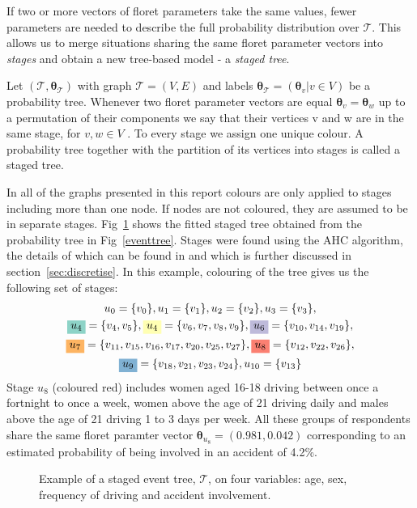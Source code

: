 \documentclass[runningheads]{llncs}
\begin{document}
If two or more vectors of floret parameters take the same values, fewer parameters are needed to describe the full probability distribution over $\mathcal{T}$. This allows us to merge situations sharing the same floret parameter vectors into \emph{stages} and obtain a new tree-based model - a \emph{staged tree}.
\begin{definition}
Let $(\mathcal{T} , \boldsymbol{\theta}_{\mathcal{T}})$ with graph $\mathcal{T} = (V, E)$ and labels $ \boldsymbol{\theta}_{\mathcal{T}} = ( \boldsymbol{\theta}_v | v \in V)$ be a probability tree. Whenever two floret parameter vectors are equal $\boldsymbol{\theta}_v = \boldsymbol{\theta}_w$ up to a permutation of their components we say that their vertices v and w are in the same stage, for $v, w \in V$ . To every stage we assign one unique colour. A probability tree together with the partition of its vertices into stages is called a staged tree.
\end{definition}
In all of the graphs presented in this report colours are only applied to stages including more than one node. If nodes are not coloured, they are assumed to be in separate stages. Fig~\ref{stagedtree} shows the fitted staged tree obtained from the probability tree in Fig~\ref{eventtree}. Stages were found using the AHC algorithm, the details of which can be found in \cite{freemansmith2011} and which is further discussed in section~\ref{sec:discretise}. In this example, colouring of the tree gives us the following set of stages:
\begin{gather*}
u_0 = \{v_0\}, u_1 = \{v_1\}, u_2 = \{v_2\}, u_3 = \{v_3\}, \\
\colorbox{col1}{$u_4$} = \{v_4, v_5\}, \colorbox{col2}{$u_4$}  = \{v_6, v_7, v_8, v_9\}, \colorbox{col3}{$u_6$}  = \{v_{10}, v_{14}, v_{19}\}, \\
\colorbox{col6}{$u_7$}  = \{v_{11}, v_{15}, v_{16}, v_{17}, v_{20}, v_{25}, v_{27}\},\colorbox{col4}{$u_8$}  = \{v_{12}, v_{22}, v_{26}\}, \\ \colorbox{col5}{$u_9$}  = \{v_{18}, v_{21}, v_{23}, v_{24}\}, u_{10} = \{v_{13}\}
\end{gather*}
Stage $u_{8}$ (coloured red) includes women aged 16-18 driving between once a fortnight to once a week, women above the age of 21 driving daily and males above the age of 21 driving 1 to 3 days per week. All these groups of respondents share the same floret paramter vector $\boldsymbol{\theta}_{u_8} = (0.981, 0.042)$ corresponding to an estimated probability of being involved in an accident of 4.2\%. 
\begin{figure}
\centering

\caption{Example of a staged event tree, $\mathcal{T}$, on four variables: age, sex, frequency of driving and accident involvement.}
\label{stagedtree}
\end{figure}
\end{document}
